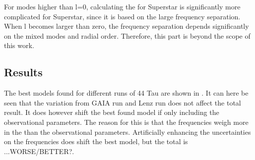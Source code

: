 For modes higher than l=0, calculating the \chis for Superstar is significantly more complicated for Superstar, since it is based on the large frequency separation. When l becomes larger than zero, the frequency separation depends significantly on the mixed modes and radial order. Therefore, this part is beyond the scope of this work. 

\subsection{Results}
The best models found for different runs of 44 Tau are shown in . It can here be seen that the variation from GAIA run and Lenz run does not affect the total result. It does however shift the best found model if only including the observational parameters. The reason for this is that the frequencies weigh more in the \chis than the observational parameters. Artificially enhancing the uncertainties on the frequencies does shift the best model, but the total \chis is ...WORSE/BETTER?.

